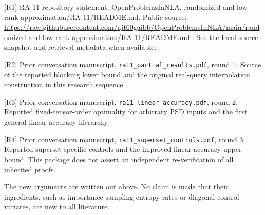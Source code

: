 \documentclass[
  10pt,
]{article}
\begin{document}
{[}R1{]} RA-11 repository statement, OpenProblemsInNLA,
randomized-and-low-rank-approximation/RA-11/README.md. Public source:
\url{https://raw.githubusercontent.com/ajt60gaibb/OpenProblemsInNLA/main/randomized-and-low-rank-approximation/RA-11/README.md}
. See the local source snapshot and retrieval metadata when available.

{[}R2{]} Prior conversation manuscript,
\texttt{ra11\_partial\_results.pdf}, round 1. Source of the reported
blocking lower bound and the original real-query interpolation
construction in this research sequence.

{[}R3{]} Prior conversation manuscript,
\texttt{ra11\_linear\_accuracy.pdf}, round 2. Reported
fixed-tensor-order optimality for arbitrary PSD inputs and the first
general linear-accuracy hierarchy.

{[}R4{]} Prior conversation manuscript,
\texttt{ra11\_superset\_controls.pdf}, round 3. Reported
superset-specific controls and the improved linear-accuracy upper bound.
This package does not assert an independent re-verification of all
inherited proofs.

The new arguments are written out above. No claim is made that their
ingredients, such as importance-sampling entropy rates or diagonal
control variates, are new to all literature.
\end{document}
